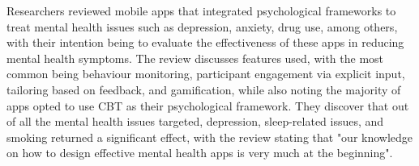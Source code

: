 \documentclass[12pt]{article}
\begin{document}


Researchers \textcite{RefWorks:RefID:87-weisel2019standalone} reviewed mobile apps that integrated
psychological frameworks to treat mental health issues such as depression, anxiety,
drug use, among others, with their intention being to evaluate the 
effectiveness of these apps in reducing mental health symptoms. The review discusses features used, 
with the most common being behaviour monitoring, participant engagement via explicit input, tailoring based on 
feedback, 
and gamification, while also noting the majority of apps opted to use CBT as their psychological framework.
They discover that out of all the mental health issues targeted, depression, sleep-related 
issues, and smoking returned a significant effect, with the review stating that "our knowledge on how to design 
effective mental health apps is very much at the beginning". \newline
\end{document}
